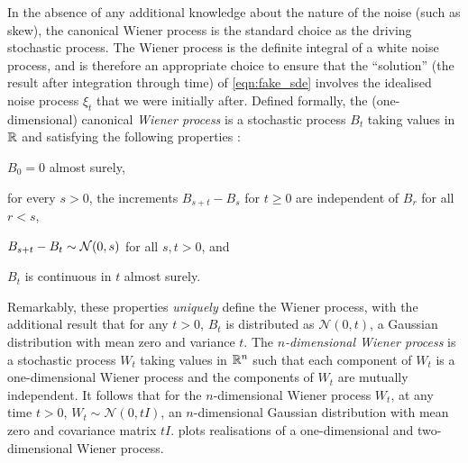 In the absence of any additional knowledge about the nature of the noise (such as skew), the canonical Wiener process is the standard choice as the driving stochastic process.
The Wiener process is the definite integral of a white noise process, and is therefore an appropriate choice to ensure that the ``solution'' (the result after integration through time) of \cref{eqn:fake_sde} involves the idealised noise process \(\xi_t\) that we were initially after. %
Defined formally, the (one-dimensional) canonical \emph{Wiener process} is a stochastic process \(B_t\) taking values in \(\mathbb{R}\) and satisfying the following properties \citep{KallianpurSundar_2014_StochasticAnalysisDiffusion}:
\begin{romanate}
	\item \(B_0 = 0\) almost surely,
	\item for every \(s > 0\), the increments \(B_{s + t} - B_{s}\) for \(t \geq 0\) are independent of \(B_r\) for all \(r < s\),
	\item \(B_{s + t} - B_t \sim\mathcal{N}\!\left(0, s\right)\) for all \(s,t > 0\), and
	\item \(B_t\) is continuous in \(t\) almost surely.
\end{romanate}
Remarkably, these properties \emph{uniquely} define the Wiener process, with the additional result that for any \(t > 0\), \(B_t\) is distributed as \(\mathcal{N}\left(0, t\right)\), a Gaussian distribution with mean zero and variance \(t\).
The \emph{\(n\)-dimensional Wiener process} is a stochastic process \(W_t\) taking values in \(\mathbb{R}^n\) such that each component of \(W_t\) is a one-dimensional Wiener process and the components of \(W_t\) are mutually independent.
It follows that for the \(n\)-dimensional Wiener process \(W_t\), at any time \(t > 0\), \(W_t \sim \mathcal{N}\left(0, tI\right)\), an \(n\)-dimensional Gaussian distribution with mean zero and covariance matrix \(tI\).
 plots realisations of a one-dimensional and two-dimensional Wiener process.

